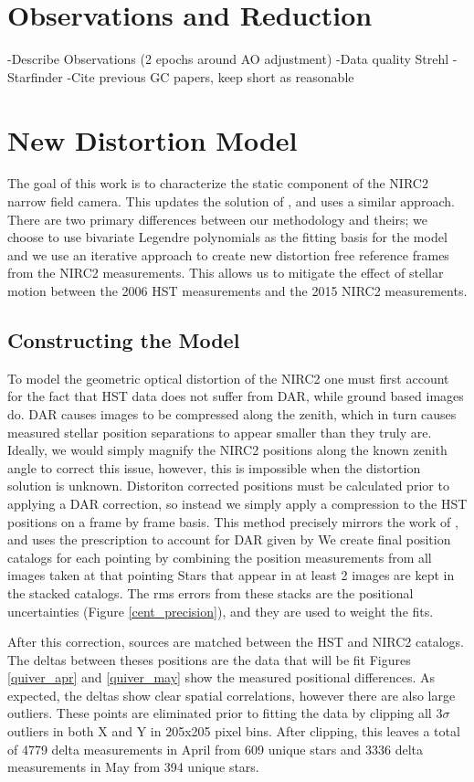 \section{Observations and Reduction}
-Describe Observations (2 epochs around AO adjustment)
-Data quality Strehl
-Starfinder
-Cite previous GC papers, keep short as reasonable

\section{New Distortion Model}
The goal of this work is to characterize the static component of the NIRC2 narrow field camera.  This updates the solution of \cite{Yelda_2010}, and uses a similar approach.  There are two primary differences between our methodology and theirs; we choose to use bivariate Legendre polynomials as the fitting basis for the model and we use an iterative approach to create new distortion free reference frames from the NIRC2 measurements.  This allows us to mitigate the effect of stellar motion between the 2006 HST measurements and the 2015 NIRC2 measurements.
\subsection{Constructing the Model}
To model the geometric optical distortion of the NIRC2 one must first account for the fact that HST data does not suffer from DAR, while ground based images do.  DAR causes images to be compressed along the zenith, which in turn causes measured stellar position separations to appear smaller than they truly are.  Ideally, we would simply magnify the NIRC2 positions along the known zenith angle to correct this issue, however,  this is impossible when the distortion solution is unknown.  Distoriton corrected positions must be calculated prior to applying a DAR correction, so instead we simply apply a compression to the HST positions on a frame by frame basis. This method precisely mirrors the work of \cite{Yelda_2010}, and uses the prescription to account for DAR given by \cite{Gubler}
We create final position catalogs for each pointing by combining the position measurements from all images taken at that pointing  Stars that appear in at least 2 images are kept in the stacked catalogs.  The rms errors from these stacks are the positional uncertainties (Figure \ref{cent_precision}), and they are used to weight the fits.

After this correction, sources are matched between the HST and NIRC2 catalogs.  The deltas between theses positions are the data that will be fit   Figures \ref{quiver_apr} and \ref{quiver_may} show the measured positional differences.  As expected, the deltas show clear spatial correlations, however there are also large outliers.  These points are eliminated prior to fitting the data by clipping all 3$\sigma$ outliers in both X and Y in 205x205 pixel bins.  After clipping, this leaves a total of 4779 delta measurements in April from 609 unique stars and 3336 delta measurements in May from 394 unique stars. 

